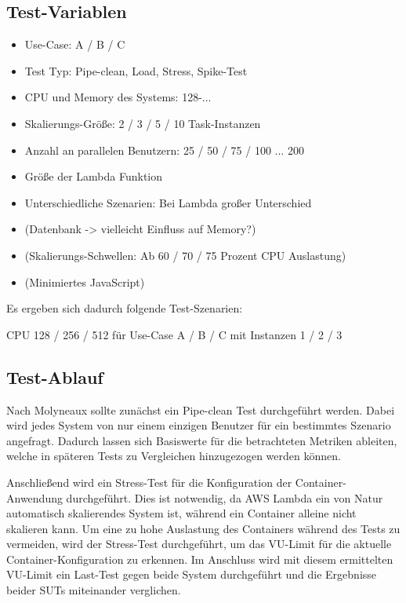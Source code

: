\subsection{Test-Variablen}
\begin{itemize}
    \item Use-Case: A / B / C
    \item Test Typ: Pipe-clean, Load, Stress, Spike-Test
    \item CPU und Memory des Systems: 128-...
    \item Skalierungs-Größe: 2 / 3 / 5 / 10 Task-Instanzen
    \item Anzahl an parallelen Benutzern: 25 / 50 / 75 / 100 ... 200
    \item Größe der Lambda Funktion
    \item Unterschiedliche Szenarien: Bei Lambda großer Unterschied 

    \item (Datenbank -> vielleicht Einfluss auf Memory?)
    \item (Skalierungs-Schwellen: Ab 60 / 70 / 75 Prozent CPU Auslastung)
    \item (Minimiertes JavaScript)
\end{itemize}


Es ergeben sich dadurch folgende Test-Szenarien:

CPU 128 / 256 / 512 für Use-Case A / B / C mit Instanzen 1 / 2 / 3 

\subsection{Test-Ablauf}
Nach Molyneaux \cite{molyneaux_art_2014} sollte zunächst ein Pipe-clean Test durchgeführt werden. Dabei wird jedes System von nur einem einzigen Benutzer für ein bestimmtes Szenario angefragt. Dadurch lassen sich Basiswerte für die betrachteten Metriken ableiten, welche in späteren Tests zu Vergleichen hinzugezogen werden können.

Anschließend wird ein Stress-Test für die Konfiguration der Container-Anwendung durchgeführt. Dies ist notwendig, da AWS Lambda ein von Natur automatisch skalierendes System ist, während ein Container alleine nicht skalieren kann. Um eine zu hohe Auslastung des Containers während des Tests zu vermeiden, wird der Stress-Test durchgeführt, um das VU-Limit für die aktuelle Container-Konfiguration zu erkennen. 
Im Anschluss wird mit diesem ermittelten VU-Limit ein Last-Test gegen beide System durchgeführt und die Ergebnisse beider SUTs miteinander verglichen.
